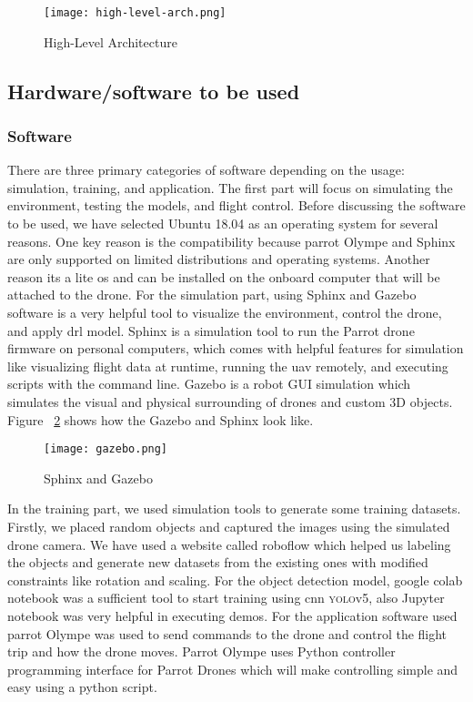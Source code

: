 \documentclass[../main.tex]{subfiles}
\begin{document}
    \begin{figure}[H]
        \centering
        \texttt{[image: high-level-arch.png]}
        \caption{High-Level Architecture}\label{fig1:arch-fig}
    \end{figure}


    \subsection{Hardware/software to be used}

    \subsubsection{Software}
    There are three primary categories of software depending on the usage: simulation, training, and application. The first part will focus on simulating the environment, testing the models, and flight control. Before discussing the software to be used, we have selected Ubuntu 18.04 as an operating system for several reasons. One key reason is the compatibility because parrot Olympe and Sphinx are only supported on limited distributions and operating systems. Another reason its a lite os and can be installed on the onboard computer that will be attached to the drone. For the simulation part, using Sphinx and Gazebo software is a very helpful tool to visualize the environment, control the drone, and apply \gls{drl} model. Sphinx is a simulation tool to run the Parrot drone firmware on personal computers, which comes with helpful features for simulation like visualizing flight data at runtime, running the \gls{uav} remotely, and executing scripts with the command line. Gazebo is a robot GUI simulation which simulates the visual and physical surrounding of drones and custom 3D objects. Figure ~\ref{fig2:gazebo} shows how the Gazebo and Sphinx look like. \begin{figure}[H]
        \centering
        \texttt{[image: gazebo.png]}
        \caption{Sphinx and Gazebo }\label{fig2:gazebo}
    \end{figure}
    In the training part, we used simulation tools to generate some training datasets. Firstly, we placed random objects and captured the images using the simulated drone camera. We have used a website called roboflow which helped us labeling the objects and generate new datasets from the existing ones with modified constraints like rotation and scaling. For the object detection model, google colab notebook was a sufficient tool to start training using \gls{cnn} \textsc{yolo}v5, also Jupyter notebook was very helpful in executing demos. For the application software used parrot Olympe was used to send commands to the drone and control the flight trip and how the drone moves. Parrot Olympe uses Python controller programming interface for Parrot Drones which will make controlling simple and easy using a python script.
\end{document}
